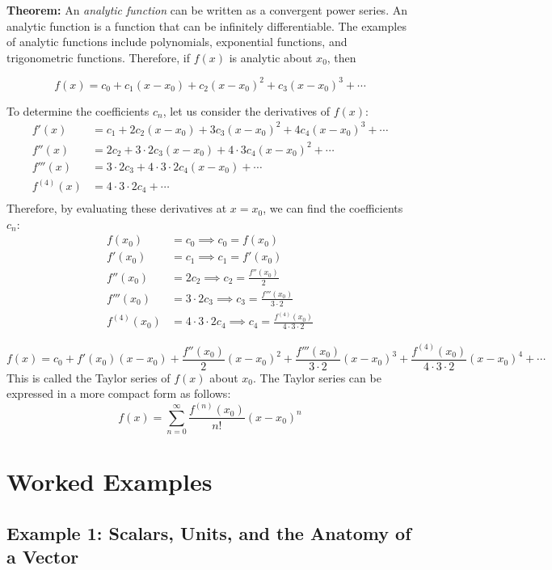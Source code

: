 \documentclass[12pt]{article}
\begin{document}
\textbf{Theorem:} An \emph{analytic function} can be written as a convergent power series. An analytic function is a function that can be infinitely differentiable. The examples of analytic functions include polynomials, exponential functions, and trigonometric functions. Therefore, if $f(x)$ is analytic about $x_0$, then

\[
f(x) = c_0 + c_1(x-x_0) + c_2(x-x_0)^2 + c_3(x-x_0)^3 + \cdots
\]

To determine the coefficients \(c_n\), let us consider the derivatives of \(f(x)\):
\begin{align*}
f'(x) &= c_1 + 2c_2(x-x_0) + 3c_3(x-x_0)^2 + 4c_4(x-x_0)^3 + \cdots \\
f''(x) &= 2c_2 + 3 \cdot 2c_3(x-x_0) + 4 \cdot 3c_4(x-x_0)^2 + \cdots \\
f'''(x) &= 3 \cdot 2c_3 + 4 \cdot 3 \cdot 2c_4(x-x_0) + \cdots \\
f^{(4)}(x) &= 4 \cdot 3 \cdot 2c_4 + \cdots \\
\end{align*}
Therefore, by evaluating these derivatives at \(x = x_0\), we can find the coefficients \(c_n\):
\begin{align*}
    f(x_0) &= c_0 \implies c_0 = f(x_0) \\
    f'(x_0) &= c_1 \implies c_1 = f'(x_0) \\
    f''(x_0) &= 2c_2 \implies c_2 = \frac{f''(x_0)}{2} \\
    f'''(x_0) &= 3 \cdot 2c_3 \implies c_3 = \frac{f'''(x_0)}{3 \cdot 2} \\
    f^{(4)}(x_0) &= 4 \cdot 3 \cdot 2c_4 \implies c_4 = \frac{f^{(4)}(x_0)}{4 \cdot 3 \cdot 2}
\end{align*}

\[
f(x) = c_0 + f'(x_0)(x-x_0) + \frac{f''(x_0)}{2}(x-x_0)^2 + \frac{f'''(x_0)}{3 \cdot 2}(x-x_0)^3 + \frac{f^{(4)}(x_0)}{4 \cdot 3 \cdot 2}(x-x_0)^4 + \cdots
\]
This is called the Taylor series of \(f(x)\) about \(x_0\). The Taylor series can be expressed in a more compact form as follows:
\[
f(x) = \sum_{n=0}^{\infty} \frac{f^{(n)}(x_0)}{n!}(x-x_0)^n
\]

\section{Worked Examples}

\subsection{Example 1: Scalars, Units, and the Anatomy of a Vector}
\end{document}
